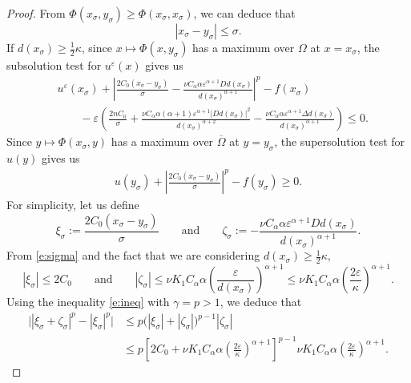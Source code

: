 \documentclass[12pt,reqno]{amsart}
\numberwithin{figure}{section}
\theoremstyle{plain}
\theoremstyle{remark}
\numberwithin{equation}{section}
\begin{document}
\begin{proof}
From $\Phi(x_\sigma, y_\sigma) \geq \Phi(x_\sigma, x_\sigma)$, we can deduce that
\begin{equation}\label{e:sigma}
    \left| x_\sigma - y_\sigma \right| \leq \sigma.  
\end{equation}
If $ d(x_\sigma) \geq \frac{1}{2}\kappa$, since $x\mapsto \Phi(x,y_\sigma)$ has a maximum over $\Omega$ at $x=x_\sigma$, the subsolution test for $u^\varepsilon(x)$ gives us
\begin{align}\label{e:subsln}
    &u^\varepsilon(x_\sigma) + \left|\frac{2C_0(x_\sigma - y_\sigma)}{\sigma} -  \frac{\nu C_\alpha\alpha \varepsilon^{\alpha+1} D d(x_\sigma)}{d(x_\sigma)^{\alpha+1}}\right|^p - f(x_\sigma)\nonumber\\
    &\qquad -\varepsilon\left(\frac{2nC_0}{\sigma}+ \frac{\nu C_\alpha\alpha(\alpha+1) \varepsilon^{\alpha+1}|D d(x_\sigma)|^2}{d(x_\sigma)^{\alpha+2}} - \frac{\nu C_\alpha\alpha \varepsilon^{\alpha+1}\Delta d(x_\sigma)}{d(x_\sigma)^{\alpha+1}}\right) \leq 0.
\end{align}
Since $y\mapsto \Phi(x_\sigma,y)$ has a maximum over $\overline{\Omega}$ at $y = y_\sigma$, the supersolution test for $u(y)$ gives us
\begin{align}\label{e:supersln}
    u(y_\sigma) + \left|\frac{2C_0(x_\sigma - y_\sigma)}{\sigma}\right|^p - f(y_\sigma) \geq 0.
\end{align}
For simplicity, let us define
\begin{equation*}
    \xi_\sigma := \frac{2C_0(x_\sigma - y_\sigma)}{\sigma} \qquad\text{and}\qquad \zeta_\sigma :=- \frac{\nu C_\alpha\alpha \varepsilon^{\alpha+1} D d(x_\sigma)}{d(x_\sigma)^{\alpha+1}}.
\end{equation*}
From \eqref{e:sigma} and the fact that we are considering $d(x_\sigma) \geq \frac{1}{2}\kappa$, 
\begin{equation*}
    |\xi_\sigma|\leq 2C_0 \qquad\text{and}\qquad |\zeta_\sigma| \leq \nu K_1 C_\alpha\alpha \left(\frac{\varepsilon}{d(x_\sigma)}\right)^{\alpha+1} \leq \nu K_1 C_\alpha \alpha  \left(\frac{2\varepsilon}{\kappa}\right)^{\alpha+1}.
\end{equation*}
Using the inequality \eqref{e:ineq} with $\gamma = p > 1$, we deduce that
\begin{align}\label{e:estia}
    \Big||\xi_\sigma +\zeta_\sigma|^p - |\xi_\sigma|^p \Big| &\leq p\Big(|\xi_\sigma|+|\zeta_\sigma|\Big)^{p-1}|\zeta_\sigma|\nonumber\\
    &\leq p\left[2C_0+\nu K_1 C_\alpha\alpha \left(\frac{2\varepsilon}{\kappa}\right)^{\alpha+1}\right]^{p-1}\nu K_1 C_\alpha\alpha \left(\frac{2\varepsilon}{\kappa}\right)^{\alpha+1}.

\end{align}
\end{proof}
\end{document}
